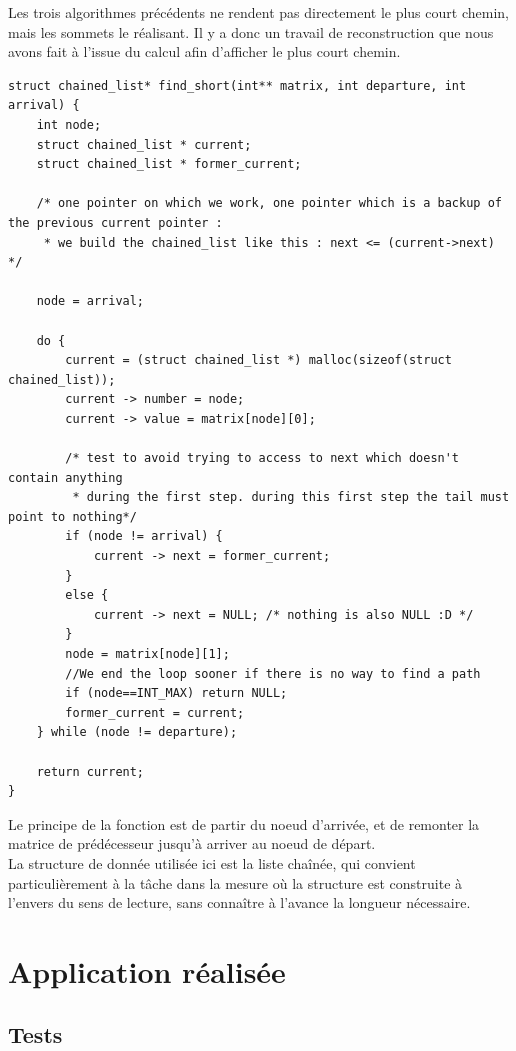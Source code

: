 \documentclass[a4paper,12pt,final] {article}
\begin{document}
Les trois algorithmes précédents ne rendent pas directement le plus court chemin, mais les sommets le réalisant. Il y a donc un travail de reconstruction que nous avons fait à l'issue du calcul afin d'afficher le plus court chemin.\\

\begin{lstlisting}
struct chained_list* find_short(int** matrix, int departure, int arrival) {
	int node;
	struct chained_list * current;
	struct chained_list * former_current;
	
	/* one pointer on which we work, one pointer which is a backup of the previous current pointer :
	 * we build the chained_list like this : next <= (current->next) */
	
	node = arrival;
	
	do {
		current = (struct chained_list *) malloc(sizeof(struct chained_list));
		current -> number = node;
		current -> value = matrix[node][0];
		
		/* test to avoid trying to access to next which doesn't contain anything 
		 * during the first step. during this first step the tail must point to nothing*/
		if (node != arrival) {
			current -> next = former_current;
		}
		else {
			current -> next = NULL; /* nothing is also NULL :D */
		}
		node = matrix[node][1];
		//We end the loop sooner if there is no way to find a path
		if (node==INT_MAX) return NULL;
		former_current = current;
	} while (node != departure);
	
	return current;
}
\end{lstlisting}

Le principe de la fonction est de partir du noeud d'arrivée, et de remonter la matrice de prédécesseur jusqu'à arriver au noeud de départ. \\

La structure de donnée utilisée ici est la liste chaînée, qui convient particulièrement à la tâche dans la mesure où la structure est construite à l'envers du sens de lecture, sans connaître à l'avance la longueur nécessaire.\\

\newpage
\section{Application réalisée}
\subsection{Tests}
\end{document}
